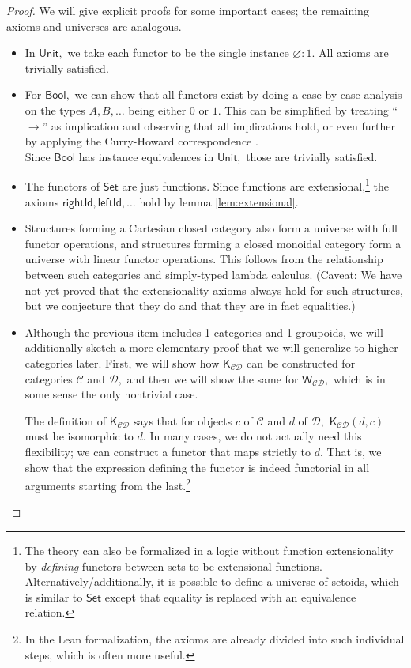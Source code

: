 \documentclass[a4paper]{article}
\theoremstyle{definition}
\theoremstyle{remark}
\renewcommand{\emptyset}{\varnothing}
\newcommand{\C}{\mathcal{C}}
\newcommand{\D}{\mathcal{D}}
\newcommand{\nm}{\mathsf}
\newcommand{\universe}{\nm}
\newcommand{\Unit}{\universe{Unit}}
\newcommand{\Bool}{\universe{Bool}}
\newcommand{\Set}{\universe{Set}}
\newcommand{\combinator}{\nm}
\newcommand{\constFun}{\combinator{K}}
\newcommand{\dupFun}{\combinator{W}}
\begin{document}
\begin{proof}
  We will give explicit proofs for some important cases; the remaining axioms and
  universes are analogous.
  \begin{itemize}
    \item In $\Unit,$ we take each functor to be the single instance $\emptyset : 1.$
    All axioms are trivially satisfied.
    \item For $\Bool,$ we can show that all functors exist by doing a case-by-case
    analysis on the types $A,B,\ldots$ being either $0$ or $1.$ This can be simplified by
    treating ``$\to$'' as implication and observing that all implications hold, or even
    further by applying the Curry-Howard correspondence \cite{curry-howard}.\\
    Since $\Bool$ has instance equivalences in $\Unit,$ those are trivially satisfied.
    \item The functors of $\Set$ are just functions. Since functions are
    extensional,\footnote{The theory can also be formalized in a logic without function
    extensionality by \emph{defining} functors between sets to be extensional functions.
    Alternatively/additionally, it is possible to define a universe of setoids, which
    is similar to $\Set$ except that equality is replaced with an equivalence relation.}
    the axioms $\nm{rightId},\nm{leftId},\ldots$ hold by lemma \ref{lem:extensional}.
    \item Structures forming a Cartesian closed category also form a universe with full
    functor operations, and structures forming a closed monoidal category form a
    universe with linear functor operations. This follows from the relationship between
    such categories and simply-typed lambda calculus. (Caveat: We have not yet proved
    that the extensionality axioms always hold for such structures, but we conjecture
    that they do and that they are in fact equalities.)
    \item Although the previous item includes 1-categories and 1-groupoids, we will
    additionally sketch a more elementary proof that we will generalize to higher
    categories later. First, we will show how $\constFun_{\C\D}$ can be constructed for
    categories $\C$ and $\D,$ and then we will show the same for $\dupFun_{\C\D},$
    which is in some sense the only nontrivial case.

    The definition of $\constFun_{\C\D}$ says that for objects $c$ of $\C$ and $d$ of
    $\D,$ $\constFun_{\C\D}(d,c)$ must be isomorphic to $d.$ In many cases, we do not
    actually need this flexibility; we can construct a functor that maps strictly to
    $d.$ That is, we show that the expression defining the functor is indeed functorial
    in all arguments starting from the last.\footnote{In the Lean formalization, the
    axioms are already divided into such individual steps, which is often more useful.}


\end{itemize}
\end{proof}
\end{document}
